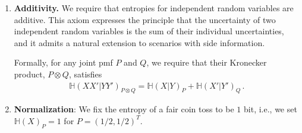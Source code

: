 \documentclass[aps,pra,11pt,onecolumn,nofootinbib,tightenlines]{revtex4-2}
\theoremstyle{definition}
\renewcommand{\H}{\mathbb{H}}
\begin{document}
\begin{enumerate}
    \smallskip

   When representing a joint probability mass function as a matrix, doubly stochastic channels acting on the system $X$ can be described by right multiplication with a doubly stochastic matrix $S$. In addition, channels acting on the side information correspond to right multiplication by a row-stochastic matrix $D$. Finally, conditional operations can be represented by a family of row sub-stochastic matrices $D_i$ acting on the right, whose sum $\sum_i D_i$ is row-stochastic, together with a corresponding family of doubly stochastic matrices $S_i$ acting on the left (see~\cite{gour2018conditional} for more details).
    Explicitly, conditionally mixing channels from $m \times n$ matrices $P$ to $m \times n'$ matrices $Q$ act as
    \begin{align}
        P \mapsto Q = \sum_{i=1}^k S_i P D_i \,, \label{eq:intro/mixing}
    \end{align}
    where $S_i$ are doubly stochastic $m \times m$ matrices for all $i$ and $D_i$ are sub-stochastic $n \times n'$ matrices such that their sum $\sum_{i=1}^k D_i$ is row-stochastic.   We require that for any conditionally mixing channel, any $P$, and $Q$ as defined in~\eqref{eq:intro/mixing}, it holds that
    \begin{align}
        \H(X|Y)_P \leq \H(X|Y')_Q \,.
    \end{align}
\label{it: conditionally mixing channels}
    \item \textbf{Additivity.} We require that entropies for independent random variables are additive. This axiom expresses the principle that the uncertainty of two independent random variables is the sum of their individual uncertainties, and it admits a natural extension to scenarios with side information.

    \smallskip
    
    Formally, for any joint pmf $P$ and $Q$, we require that their Kronecker product, $P \otimes Q$, satisfies
    \begin{align}
        \H(XX'|YY')_{P\otimes Q} = \H(X|Y)_P + \H(X'|Y')_Q \,.
    \end{align}

    \item \textbf{Normalization}: We fix the entropy of a fair coin toss to be $1$ bit, i.e., we set $\H(X)_P = 1$ for $P = (1/2,1/2)^T$. 

\end{enumerate}

\end{document}
